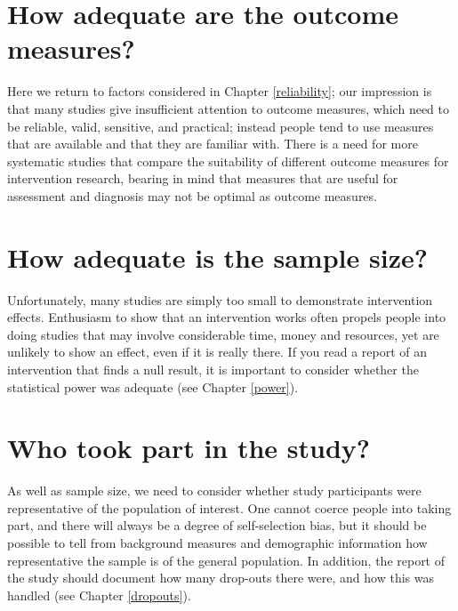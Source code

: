 \documentclass{krantz}
\begin{document}
\hypertarget{how-adequate-are-the-outcome-measures}{%
\section{How adequate are the outcome measures?}\label{how-adequate-are-the-outcome-measures}}

Here we return to factors considered in Chapter \ref{reliability}; our impression is that many studies give insufficient attention to outcome measures, which need to be reliable, valid, sensitive, and practical; instead people tend to use measures that are available and that they are familiar with. There is a need for more systematic studies that compare the suitability of different outcome measures for intervention research, bearing in mind that measures that are useful for assessment and diagnosis may not be optimal as outcome measures.

\hypertarget{how-adequate-is-the-sample-size}{%
\section{How adequate is the sample size?}\label{how-adequate-is-the-sample-size}}

Unfortunately, many studies are simply too small to demonstrate intervention effects. Enthusiasm to show that an intervention works often propels people into doing studies that may involve considerable time, money and resources, yet are unlikely to show an effect, even if it is really there. If you read a report of an intervention that finds a null result, it is important to consider whether the statistical power was adequate (see Chapter \ref{power}).

\hypertarget{who-took-part-in-the-study}{%
\section{Who took part in the study?}\label{who-took-part-in-the-study}}

As well as sample size, we need to consider whether study participants were representative of the population of interest. One cannot coerce people into taking part, and there will always be a degree of self-selection bias, but it should be possible to tell from background measures and demographic information how representative the sample is of the general population. In addition, the report of the study should document how many drop-outs there were, and how this was handled (see Chapter \ref{dropouts}).
\end{document}
